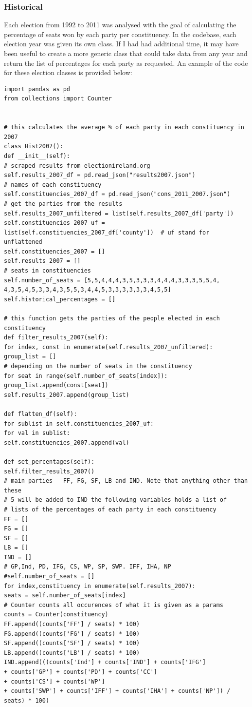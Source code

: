 \subsubsection{Historical}
Each election from 1992 to 2011 was analysed with the goal of calculating the percentage of seats won by each party per constituency. In the codebase, each election year was given its own class. If I had had additional time, it may have been useful to create a more generic class that could take data from any year and return the list of percentages for each party as requested.  An example of the code for these election classes is provided below: 
\begin{verbatim}
import pandas as pd
from collections import Counter


# this calculates the average % of each party in each constituency in 2007
class Hist2007():
def __init__(self):
# scraped results from electionireland.org
self.results_2007_df = pd.read_json("results2007.json") 
# names of each constituency
self.constituencies_2007_df = pd.read_json("cons_2011_2007.json") 
# get the parties from the results
self.results_2007_unfiltered = list(self.results_2007_df['party']) 
self.constituencies_2007_uf = list(self.constituencies_2007_df['county'])  # uf stand for unflattened
self.constituencies_2007 = []
self.results_2007 = []
# seats in constituencies
self.number_of_seats = [5,5,4,4,4,3,5,3,3,3,4,4,4,3,3,3,5,5,4,
4,3,5,4,5,3,3,4,3,5,5,3,4,4,5,3,3,3,3,3,3,4,5,5]
self.historical_percentages = []

# this function gets the parties of the people elected in each constituency
def filter_results_2007(self): 
for index, const in enumerate(self.results_2007_unfiltered):
group_list = []
# depending on the number of seats in the constituency
for seat in range(self.number_of_seats[index]): 
group_list.append(const[seat])
self.results_2007.append(group_list)

def flatten_df(self):
for sublist in self.constituencies_2007_uf:
for val in sublist:
self.constituencies_2007.append(val)

def set_percentages(self):
self.filter_results_2007()
# main parties - FF, FG, SF, LB and IND. Note that anything other than these 
# 5 will be added to IND the following variables holds a list of 
# lists of the percentages of each party in each constituency
FF = []
FG = []
SF = []
LB = []
IND = []
# GP,Ind, PD, IFG, CS, WP, SP, SWP. IFF, IHA, NP
#self.number_of_seats = []
for index,constituency in enumerate(self.results_2007):
seats = self.number_of_seats[index]
# Counter counts all occurences of what it is given as a params
counts = Counter(constituency)
FF.append((counts['FF'] / seats) * 100)
FG.append((counts['FG'] / seats) * 100)
SF.append((counts['SF'] / seats) * 100)
LB.append((counts['LB'] / seats) * 100)
IND.append(((counts['Ind'] + counts['IND'] + counts['IFG'] 
+ counts['GP'] + counts['PD'] + counts['CC']
+ counts['CS'] + counts['WP'] 
+ counts['SWP'] + counts['IFF'] + counts['IHA'] + counts['NP']) / seats) * 100)


\end{verbatim}
